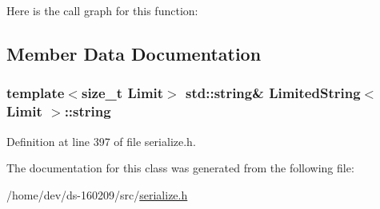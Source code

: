 Here is the call graph for this function\+:




\subsection{Member Data Documentation}
\hypertarget{class_limited_string_a3f1d004f4632f7b2fda1a5a5afc266f7}{}
\subsubsection[{string}]{\setlength{\rightskip}{0pt plus 5cm}template$<$size\+\_\+t Limit$>$ std\+::string\& {\bf Limited\+String}$<$ Limit $>$\+::string\hspace{0.3cm}{\ttfamily [protected]}}\label{class_limited_string_a3f1d004f4632f7b2fda1a5a5afc266f7}


Definition at line 397 of file serialize.\+h.



The documentation for this class was generated from the following file\+:\begin{DoxyCompactItemize}
\item 
/home/dev/ds-\/160209/src/\hyperlink{serialize_8h}{serialize.\+h}\end{DoxyCompactItemize}
